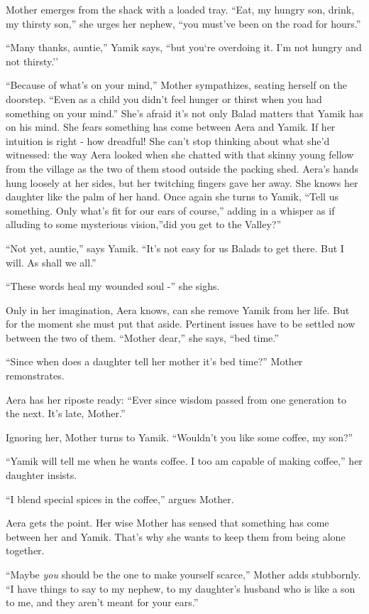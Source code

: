 \documentclass[twoside,11pt]{book}
\begin{document}
Mother emerges from the shack with a loaded tray. ``Eat, my hungry
son, drink, my thirsty son,'' she urges her
nephew, ``you must've been on the road for
hours.''

``Many thanks, auntie,'' Yamik says, ``but
you`re overdoing it. I'm not hungry and not thirsty.''

``Because of what's on your mind,'' Mother sympathizes, seating herself on the doorstep. ``Even as a child you
didn't feel hunger or thirst when you had something on your mind.''  She's afraid it's not only Balad matters that
Yamik has on his mind. She fears something has come between Aera and Yamik. If her intuition is right - how dreadful!
She can't stop thinking about what she'd witnessed: the way Aera looked when she chatted with that
skinny young fellow from the village as the two of them stood outside the packing shed. Aera's
hands hung loosely at her sides, but her twitching fingers gave her away.  She knows her daughter like the palm of her
hand.  Once again she turns to Yamik, ``Tell us something. Only what's fit for our ears of course,'' adding in a
whisper as if alluding to some mysterious vision,''did you get to the Valley?''

``Not yet, auntie,'' says Yamik. ``It's not easy for us Balads to get there. But I will. As shall we all.''

``These words heal my wounded soul -'' she sighs.

Only in her imagination, Aera knows, can she remove Yamik from her life. But for the moment she must put that aside.
Pertinent issues have to be settled now between the two of them. ``Mother dear,'' she says, ``bed time.'' 

``Since when does a daughter tell her mother it's bed time?'' Mother remonstrates.

Aera has her riposte ready: ``Ever since wisdom passed from one generation to the next. It's late, Mother.''

Ignoring her, Mother turns to Yamik. ``Wouldn't you like some coffee, my son?''

``Yamik will tell me when he wants coffee. I too am capable of making coffee,'' her daughter insists.

``I blend special spices in the coffee,'' argues Mother.

Aera gets the point. Her wise Mother has sensed that something has come between her and Yamik. That's why she wants to
keep them from being alone together.

``Maybe \textit{you} should be the one to make yourself scarce,'' Mother adds stubbornly. ``I have things to say to my
nephew, to my daughter's husband who is like a son to me, and they aren't meant for your ears.''
\end{document}
